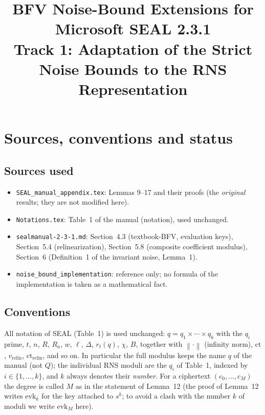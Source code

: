 \documentclass[11pt]{article}
\title{BFV Noise-Bound Extensions for Microsoft SEAL 2.3.1\\[0.3em]
       Track 1: Adaptation of the Strict Noise Bounds to the RNS Representation}
\author{}
\date{}
\newcommand{\norm}[1]{\left\lVert #1\right\rVert}
\newcommand{\ct}{\mathrm{ct}}
\newcommand{\ctrelin}{\mathrm{ct}_{\mathrm{relin}}}
\newcommand{\vrelin}{v_{\mathrm{relin}}}
\theoremstyle{plain}
\theoremstyle{definition}
\theoremstyle{remark}
\begin{document}
\maketitle

\section{Sources, conventions and status}

\subsection{Sources used}

\begin{itemize}[leftmargin=2em]
\item \texttt{SEAL\_manual\_appendix.tex}: Lemmas 9--17 and their proofs
      (the \emph{original} results; they are not modified here).
\item \texttt{Notations.tex}: Table~1 of the manual (notation), used unchanged.
\item \texttt{sealmanual-2-3-1.md}: Section~4.3 (textbook-BFV, evaluation keys),
      Section~5.4 (relinearization), Section~5.8 (composite coefficient modulus),
      Section~6 (Definition~1 of the invariant noise, Lemma~1).
\item \texttt{noise\_bound\_implementation}: reference only; no formula of the
      implementation is taken as a mathematical fact.
\end{itemize}

\subsection{Conventions}

All notation of SEAL (Table~1) is used unchanged: $q=q_1\times\cdots\times q_k$
with the $q_i$ prime, $t$, $n$, $R$, $R_a$, $w$, $\ell$, $\Delta$, $r_t(q)$,
$\chi$, $B$, together with $\norm{\cdot}$ (infinity norm), $\ct$, $\vrelin$,
$\ctrelin$, and so on. In particular the full modulus keeps the name $q$ of the
manual (not $Q$); the individual RNS moduli are the $q_i$ of Table~1, indexed by
$i\in\{1,\dots,k\}$, and $k$ always denotes their \emph{number}. For a ciphertext
$(c_0,\dots,c_M)$ the degree is called $M$ as in the statement of Lemma~12 (the
proof of Lemma~12 writes $\mathrm{evk}_k$ for the key attached to $s^k$; to avoid a
clash with the number $k$ of moduli we write $\mathrm{evk}_M$ here).
\end{document}
